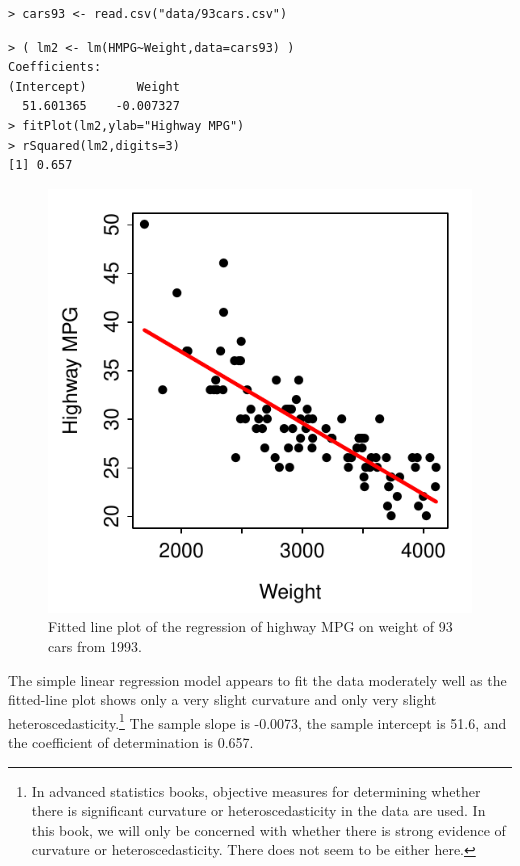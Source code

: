 \documentclass[10pt,openany]{book}\usepackage[]{graphicx}\usepackage[]{color}
\makeatletter
\newenvironment{kframe}{%
 \def\at@end@of@kframe{}%
 \ifinner\ifhmode%
  \def\at@end@of@kframe{\end{minipage}}%
  \begin{minipage}{\columnwidth}%
 \fi\fi%
 \def\FrameCommand##1{\hskip\@totalleftmargin \hskip-\fboxsep
 \colorbox{shadecolor}{##1}\hskip-\fboxsep
     \hskip-\linewidth \hskip-\@totalleftmargin \hskip\columnwidth}%
 \MakeFramed {\advance\hsize-\width
   \@totalleftmargin\z@ \linewidth\hsize
   \@setminipage}}%
 {\par\unskip\endMakeFramed%
 \at@end@of@kframe}
\newenvironment{knitrout}{}{} %
\makeatother
\begin{document}
\begin{knitrout}
\color{fgcolor}\begin{kframe}
\begin{verbatim}
> cars93 <- read.csv("data/93cars.csv")
\end{verbatim}
\end{kframe}
\end{knitrout}
\vspace{-12pt}
\begin{knitrout}
\color{fgcolor}\begin{kframe}
\begin{verbatim}
> ( lm2 <- lm(HMPG~Weight,data=cars93) )
Coefficients:
(Intercept)       Weight  
  51.601365    -0.007327  
> fitPlot(lm2,ylab="Highway MPG")
> rSquared(lm2,digits=3)
[1] 0.657
\end{verbatim}
\end{kframe}\begin{figure}[hbtp]

{\centering \includegraphics[width=.4\linewidth]{Figs/CarFit-1} 

}

\caption[Fitted line plot of the regression of highway MPG on weight of 93 cars from 1993]{Fitted line plot of the regression of highway MPG on weight of 93 cars from 1993.}\label{fig:CarFit}
\end{figure}


\end{knitrout}

The simple linear regression model appears to fit the data moderately well as the fitted-line plot  shows only a very slight curvature and only very slight heteroscedasticity.\footnote{In advanced statistics books, objective measures for determining whether there is significant curvature or heteroscedasticity in the data are used. In this book, we will only be concerned with whether there is strong evidence of curvature or heteroscedasticity. There does not seem to be either here.}  The sample slope is -0.0073, the sample intercept is 51.6, and the coefficient of determination is 0.657.
\end{document}
